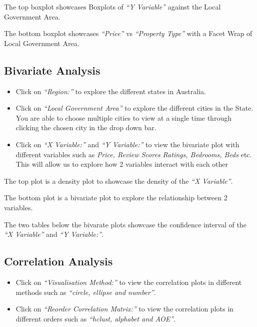 \documentclass[
]{article}
\providecommand{\tightlist}{%
  \setlength{\itemsep}{0pt}\setlength{\parskip}{0pt}}
\begin{document}
The top boxplot showcases Boxplots of \emph{``Y Variable''} against the
Local Government Area.

The bottom boxplot showcases \emph{``Price''} vs \emph{``Property
Type''} with a Facet Wrap of Local Government Area.

\hypertarget{bivariate-analysis}{%
\subsection{Bivariate Analysis}\label{bivariate-analysis}}

\begin{itemize}
\tightlist
\item
  Click on \emph{``Region:''} to explore the different states in
  Australia.
\item
  Click on \emph{``Local Government Area''} to explore the different
  cities in the State. You are able to choose multiple cities to view at
  a single time through clicking the chosen city in the drop down bar.
\item
  Click on \emph{``X Variable:''} and \emph{``Y Variable:''} to view the
  bivariate plot with different variables such as \emph{Price, Review
  Scores Ratings, Bedrooms, Beds} etc. This will allow us to explore how
  2 variables interact with each other
\end{itemize}

The top plot is a density plot to showcase the density of the \emph{``X
Variable''}.

The bottom plot is a bivariate plot to explore the relationship between
2 variables.

The two tables below the bivarate plots showcase the confidence interval
of the \emph{``X Variable''} and \emph{``Y Variable:''}.

\hypertarget{correlation-analysis}{%
\subsection{Correlation Analysis}\label{correlation-analysis}}

\begin{itemize}
\tightlist
\item
  Click on \emph{``Visualisation Method:''} to view the correlation
  plots in different methods such as \emph{``circle, ellipse and
  number''}.
\item
  Click on \emph{``Reorder Correlation Matrix:''} to view the
  correlation plots in different orders such as \emph{``hclust, alphabet
  and AOE''}.
\end{itemize}
\end{document}
